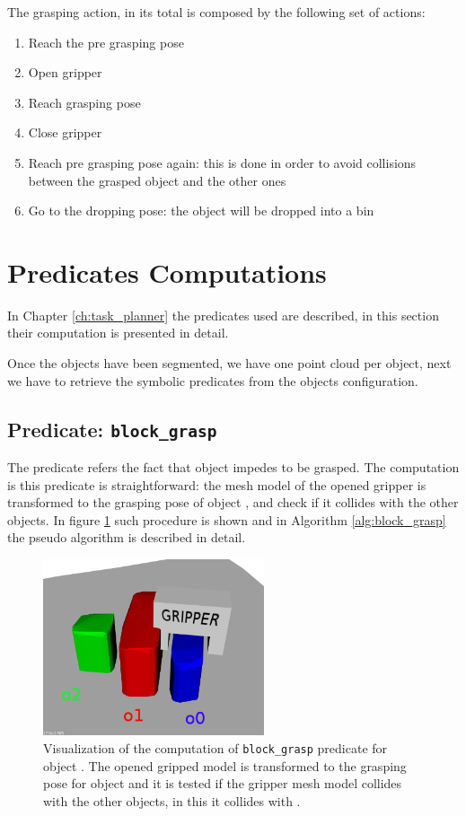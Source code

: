 The grasping action, in its total is composed by the following set of actions: 
\begin{enumerate}
\item Reach the pre grasping pose
\item Open gripper
\item Reach grasping pose
\item Close gripper
\item Reach pre grasping pose again: this is done in order to avoid collisions between the grasped object and the other ones
\item Go to the dropping pose: the object will be dropped into a bin
\end{enumerate}

\section{Predicates Computations}
In Chapter \ref{ch:task_planner}  the predicates used are described, in this section their computation is presented in detail. 

Once the objects have been segmented, we have one point cloud per object, next we have to retrieve the symbolic predicates from the objects configuration. 

\subsection{Predicate: \texttt{block\_grasp}}
The  predicate refers the fact that object  impedes  to be grasped. The computation is this predicate is straightforward: the mesh model of the opened gripper is transformed to the grasping pose of object , and check if it collides with the other objects. In figure \ref{fig:block_grasp} such procedure is shown and in Algorithm \ref{alg:block_grasp} the pseudo algorithm is described in detail. 

\begin{figure}[h]
\centering
\includegraphics[width=6.5cm]{Img/grasping/block_grasp.png}
\caption{Visualization of the computation of \texttt{block\_grasp} predicate for object . The opened gripped model is transformed to the grasping pose for object  and it is tested if the gripper mesh model collides with the other objects, in this it collides with . }\label{fig:block_grasp}
\end{figure}

